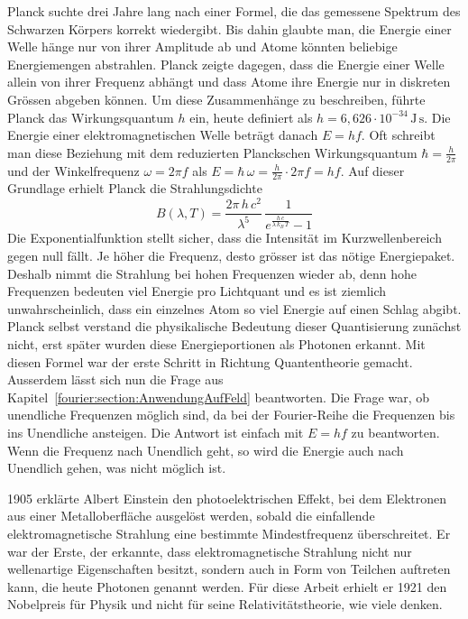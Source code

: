 	Planck suchte drei Jahre lang nach einer Formel, die das gemessene Spektrum des Schwarzen Körpers korrekt wiedergibt.  
	Bis dahin glaubte man, die Energie einer Welle hänge nur von ihrer Amplitude ab und Atome könnten beliebige Energiemengen abstrahlen.  
	Planck zeigte dagegen, dass die Energie einer Welle allein von ihrer Frequenz abhängt und dass Atome ihre Energie nur in diskreten Grössen abgeben können.  
	Um diese Zusammenhänge zu beschreiben, führte Planck das Wirkungsquantum $h$ ein, heute definiert als  
	$
	h = 6{,}626\cdot10^{-34}\,\mathrm{J\,s}.
	$
	Die Energie einer elektromagnetischen Welle beträgt danach $E = hf$.  
	Oft schreibt man diese Beziehung mit dem reduzierten Planckschen Wirkungsquantum $\hbar = \tfrac{h}{2\pi}$ und der Winkelfrequenz $\omega = 2\pi f$ als  
	$
	E = \hbar\,\omega = \frac{h}{2\pi}\cdot2\pi f = h f.
	$
	Auf dieser Grundlage erhielt Planck die Strahlungsdichte  
	\begin{equation}
		B(\lambda,T)
		= \frac{2\pi\,h\,c^2}{\lambda^5}\,\frac{1}{e^{\frac{h\,c}{\lambda\,k_B\,T}} - 1}
	\end{equation}
	Die Exponentialfunktion stellt sicher, dass die Intensität im Kurz­wellenbereich gegen null fällt. 
	Je höher die Frequenz, desto grösser ist das nötige Energiepaket. 
	Deshalb nimmt die Strahlung bei hohen Frequenzen wieder ab, denn hohe Frequenzen bedeuten viel Energie pro Lichtquant und es ist ziemlich unwahrscheinlich, dass ein einzelnes Atom so viel Energie auf einen Schlag abgibt. 
	Planck selbst verstand die physikalische Bedeutung dieser Quantisierung zunächst nicht, erst später wurden diese Energieportionen als Photonen erkannt.  
	Mit diesen Formel war der erste Schritt in Richtung Quantentheorie gemacht.
	Ausserdem lässt sich nun die Frage aus Kapitel~\ref{fourier:section:AnwendungAufFeld} beantworten. 
	Die Frage war, ob unendliche Frequenzen möglich sind, da bei der Fourier-Reihe die Frequenzen bis ins Unendliche ansteigen. 
	Die Antwort ist einfach mit $E = hf$ zu beantworten. Wenn die Frequenz nach Unendlich geht, so wird die Energie auch nach Unendlich gehen, was nicht möglich ist.

	
	
	1905 erklärte Albert Einstein den photoelektrischen Effekt, bei dem Elektronen aus einer Metalloberfläche ausgelöst werden, sobald die einfallende elektromagnetische Strahlung eine bestimmte Mindestfrequenz überschreitet.  
	Er war der Erste, der erkannte, dass elektromagnetische Strahlung nicht nur wellenartige Eigenschaften besitzt, sondern auch in Form von Teilchen auftreten kann, die heute Photonen genannt werden.  
	Für diese Arbeit erhielt er 1921 den Nobelpreis für Physik und nicht für seine Relativitätstheorie, wie viele denken.
	
